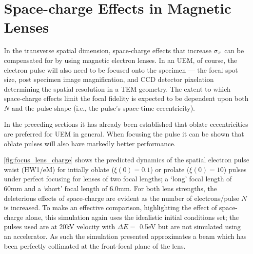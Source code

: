 
\section{Space-charge Effects in Magnetic Lenses} \label{sec:mag_lens_charge}

In the transverse spatial dimension, space-charge effects that increase $ \sigma_{ {\scriptscriptstyle T} } $ can be compensated for by using magnetic electron lenses.\cite{oudheusden_electron_2007,lagrange_nanosecond_2008}
In an UEM, of course, the electron pulse will also need to be focused onto the specimen --- the focal spot size, post specimen image magnification, and CCD detector pixelation determining the spatial resolution in a TEM geometry.\cite{berger_dc_2009}
The extent to which space-charge effects limit the focal fidelity is expected to be dependent upon both $N$ and the pulse shape (i.e., the pulse's space-time eccentricity).

In the preceding sections it has already been established that oblate eccentricities are preferred for UEM in general.
When focusing the pulse it can be shown that oblate pulses will also have markedly better performance.



\ref{fig:focus_lens_charge} shows the predicted dynamics of the spatial electron pulse waist (HW1/eM) for intially oblate ($ \xi ( 0 ) = 0.1 $) or prolate ($ \xi ( 0 ) = 10 $) pulses under perfect focusing for lenses of two focal lengths; a `long' focal length of 60mm and a `short' focal length of 6.0mm.
For both lens strengths, the deleterious effects of space-charge are evident as the number of electrons/pulse $ N $ is increased.
To make an effective comparison, highlighting the effect of space-charge alone, this simulation again uses the idealistic initial conditions set; the pulses used are at 20kV velocity with $\Delta E = $ 0.5eV but are not simulated using an accelerator.
As such the simulation presented approximates a beam which has been perfectly collimated at the front-focal plane of the lens.

